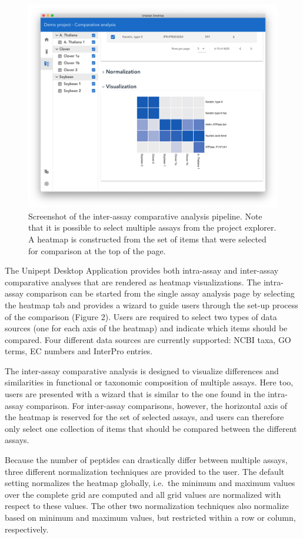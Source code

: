 \begin{figure}
\centering
\includegraphics{resources/figures/chapter2_comparative_analysis_screenshot.png}
\caption{Screenshot of the inter-assay comparative analysis pipeline.
Note that it is possible to select multiple assays from the project
explorer. A heatmap is constructed from the set of items that were
selected for comparison at the top of the page.}
\end{figure}

The Unipept Desktop Application provides both intra-assay and
inter-assay comparative analyses that are rendered as heatmap
visualizations. The intra-assay comparison can be started from the
single assay analysis page by selecting the heatmap tab and provides a
wizard to guide users through the set-up process of the comparison
(Figure 2). Users are required to select two types of data sources (one
for each axis of the heatmap) and indicate which items should be
compared. Four different data sources are currently supported: NCBI
taxa, GO terms, EC numbers and InterPro entries.

The inter-assay comparative analysis is designed to visualize
differences and similarities in functional or taxonomic composition of
multiple assays. Here too, users are presented with a wizard that is
similar to the one found in the intra-assay comparison. For inter-assay
comparisons, however, the horizontal axis of the heatmap is reserved for
the set of selected assays, and users can therefore only select one
collection of items that should be compared between the different
assays.

Because the number of peptides can drastically differ between multiple
assays, three different normalization techniques are provided to the
user. The default setting normalizes the heatmap globally, i.e.~the
minimum and maximum values over the complete grid are computed and all
grid values are normalized with respect to these values. The other two
normalization techniques also normalize based on minimum and maximum
values, but restricted within a row or column, respectively.

